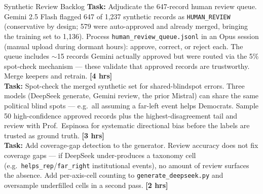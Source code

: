 \documentclass[11pt]{article}
\newcommand{\hrs}[1]{\textbf{[#1 hrs]}}
\newcommand{\task}[2]{%
  \noindent\textbf{Task:} #1 \hfill \hrs{#2}\\}
\begin{document}
\begin{taskbox}{Synthetic Review Backlog}
\task{Adjudicate the 647-record human review queue. Gemini 2.5 Flash flagged
  647 of 1,237 synthetic records as \texttt{HUMAN\_REVIEW} (conservative by
  design; 579 were auto-approved and already merged, bringing the training set
  to 1,136). Process \texttt{human\_review\_queue.jsonl} in an Opus session
  (manual upload during dormant hours): approve, correct, or reject each. The
  queue includes $\sim$15 records Gemini actually approved but were routed via
  the 5\% spot-check mechanism --- these validate that approved records are
  trustworthy. Merge keepers and retrain.}{4}

\task{Spot-check the merged synthetic set for shared-blindspot errors. Three
  models (DeepSeek generate, Gemini review, the prior Mistral) can share the
  same political blind spots --- e.g.\ all assuming a far-left event helps
  Democrats. Sample 50 high-confidence approved records plus the
  highest-disagreement tail and review with Prof.\ Espinosa for systematic
  directional bias before the labels are trusted as ground truth.}{3}

\task{Add coverage-gap detection to the generator. Review accuracy does not
  fix coverage gaps --- if DeepSeek under-produces a taxonomy cell
  (e.g.\ \texttt{helps\_rep}/\texttt{far\_right} institutional events), no
  amount of review surfaces the absence. Add per-axis-cell counting to
  \texttt{generate\_deepseek.py} and oversample underfilled cells in a second
  pass.}{2}
\end{taskbox}
\end{document}
